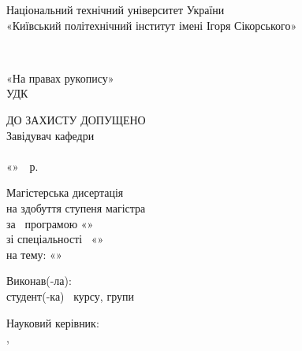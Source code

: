 %
\thispagestyle{empty}

\begin{center}
  Національний технічний університет України\\
  «Київський політехнічний інститут імені Ігоря Сікорського»
\end{center}

\vspace{1em}
\noindent\facultyName\\
\departmentName

\vspace{2em}
\noindent
\begin{minipage}[t]{7.5cm}
  «На правах рукопису»\\
  УДК~\udcCode
\end{minipage}%
\hfill
\begin{minipage}[t]{7.5cm}
  \raggedleft
  ДО ЗАХИСТУ ДОПУЩЕНО\\
  Завідувач кафедри\\
  \hrulefill\ \departmentHeadName\\
  «\hrulefill»\hrulefill~\thesisYear~р.
\end{minipage}

\vspace{2em}
\begin{center}
  Магістерська дисертація\\
  на здобуття ступеня магістра\\
  за \programmeType~програмою «\programmeName»\\
  зі спеціальності \specialtyCode~«\specialtyName»\\
  на тему: «\thesisTitle»
\end{center}

\vspace{2em}
\noindent Виконав(-ла):\\
студент(-ка) \authorCourse~курсу, групи \authorGroup\\
\authorFullName \hfill \hrulefill

\medskip
\noindent Науковий керівник:\\
\supervisorRegalia,\\
\supervisorFullName \hfill \hrulefill

